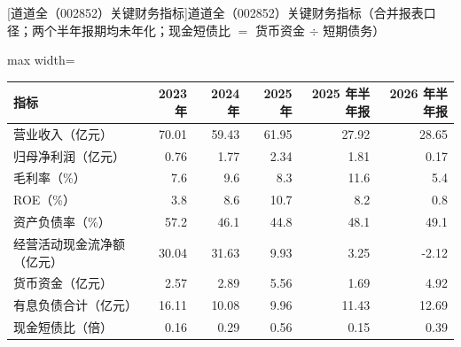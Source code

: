 \begin{center}\small\setlength{\tabcolsep}{3.4pt}
[道道全（002852）关键财务指标]{道道全（002852）关键财务指标（合并报表口径；两个半年报期均未年化；现金短债比 $=$ 货币资金 $\div$ 短期债务）}
\begin{adjustbox}{max width=\textwidth}
\begin{tabular}{@{}lrrrrr@{}}
\toprule
指标 & 2023 年 & 2024 年 & 2025 年 & 2025 年半年报 & 2026 年半年报 \\
\midrule
营业收入（亿元） & 70.01 & 59.43 & 61.95 & 27.92 & 28.65 \\
归母净利润（亿元） & 0.76 & 1.77 & 2.34 & 1.81 & 0.17 \\
毛利率（\%） & 7.6 & 9.6 & 8.3 & 11.6 & 5.4 \\
ROE（\%） & 3.8 & 8.6 & 10.7 & 8.2 & 0.8 \\
资产负债率（\%） & 57.2 & 46.1 & 44.8 & 48.1 & 49.1 \\
经营活动现金流净额（亿元） & 30.04 & 31.63 & 9.93 & 3.25 & -2.12 \\
货币资金（亿元） & 2.57 & 2.89 & 5.56 & 1.69 & 4.92 \\
有息负债合计（亿元） & 16.11 & 10.08 & 9.96 & 11.43 & 12.69 \\
现金短债比（倍） & 0.16 & 0.29 & 0.56 & 0.15 & 0.39 \\
\bottomrule
\end{tabular}
\end{adjustbox}
\end{center}

